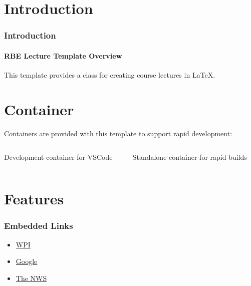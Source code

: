 



\section{Introduction}

\begin{frame}[label=introduction]
\frametitle{Introduction}
\framesubtitle{RBE Lecture Template Overview}

This template provides a class for creating course lectures in \LaTeX.  

\end{frame}



\section{Container}

\begin{frame}[label=buildContainer]

Containers are provided with this template to support rapid development:

\begin{columns}
  \begin{column}{0.5\textwidth}
    Development container for VSCode
  \end{column}
  \begin{column}{0.5\textwidth}
    Standalone container for rapid builds
  \end{column}
\end{columns}


\end{frame}

\section{Features}



\begin{frame}[label=URLFRAME]
\frametitle{Embedded Links}


\begin{itemize}
    \item \href{https://www.wpi.edu}{WPI}
    \item \href{https://google.com}{Google}
    \item \href{http://www.weather.gov}{The NWS}
\end{itemize}


\end{frame}



